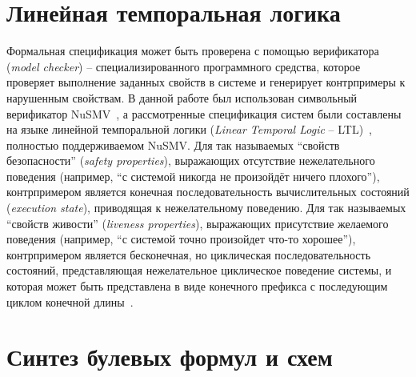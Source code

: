 

\section{Линейная темпоральная логика}%
\label{sub:ltl}


Формальная спецификация может быть проверена с помощью верификатора (\textit{model checker}) \--- специализированного программного средства, которое проверяет выполнение заданных свойств в системе и генерирует контрпримеры к нарушенным свойствам.
В данной работе был использован символьный верификатор NuSMV~\cite{NuSMV}, а рассмотренные спецификация систем были составлены на языке линейной темпоральной логики (\textit{Linear Temporal Logic} \--- LTL)~\cite{ltl}, полностью поддерживаемом NuSMV\@.
Для так называемых \enquote{свойств безопасности} (\textit{safety properties}), выражающих отсутствие нежелательного поведения (например, \enquote{с системой никогда не произойдёт ничего плохого}), контрпримером является конечная последовательность вычислительных состояний (\textit{execution state}), приводящая к нежелательному поведению.
Для так называемых \enquote{свойств живости} (\textit{liveness properties}), выражающих присутствие желаемого поведения (например, \enquote{с системой точно произойдет что-то хорошее}), контрпримером является бесконечная, но циклическая последовательность состояний, представляющая нежелательное циклическое поведение системы, и которая может быть представлена в виде конечного префикса с последующим циклом конечной длины~\cite{clarke1999}.



\section{Синтез булевых формул и схем}
\label{sub:circuits-synthesis}

